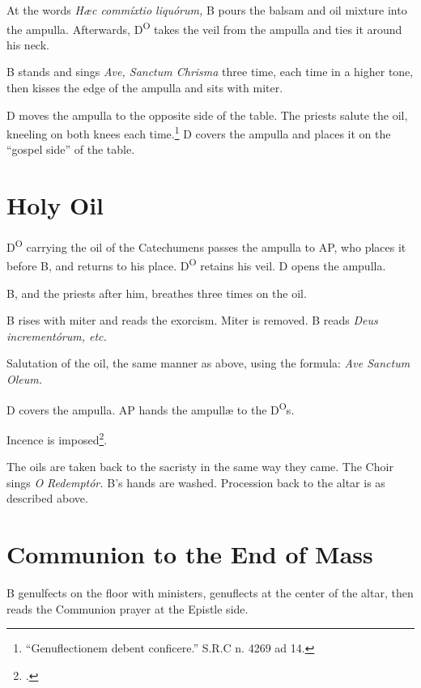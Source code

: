 \documentclass{report}
\begin{document}
\begin{multicols}{2}
    \rubric At the words \textit{Hæc commíxtio liquórum,} B pours the balsam
    and oil mixture into the ampulla. Afterwards, D\textsuperscript{O} takes
    the veil from the ampulla and ties it around his neck.

    \rubric B stands and sings \textit{Ave, Sanctum Chrisma} three time, each
    time in a higher tone, then kisses the edge of the ampulla and sits with
    miter.

    \rubric D moves the ampulla to the opposite side of the table. The priests
    salute the oil, kneeling on both knees each time.\footnote{``Genuflectionem
    debent conficere.'' S.R.C n. 4269 ad 14.} D covers the ampulla and places
    it on the ``gospel side'' of the table.

    \section{Holy Oil}

    \rubric D\textsuperscript{O} carrying the oil of the Catechumens passes the
    ampulla to AP, who places it before B, and returns to his place.
    D\textsuperscript{O} retains his veil. D opens the ampulla.

    \rubric B, and the priests after him, breathes three times on the oil.

    \rubric B rises with miter and reads the exorcism. Miter is removed. B
    reads \textit{Deus incrementórum, etc.}

    \rubric Salutation of the oil, the same manner as above, using the formula:
    \textit{Ave Sanctum Oleum.}

    \rubric D covers the ampulla. AP hands the ampullæ to the
    D\textsuperscript{O}s.

    \rubric Incence is imposed\footcite[It appears that B does not need to
    impose this incense, but it can be done by MC1 or MC2 or by TH himself.][p.
    190]{stehle}.

    \rubric The oils are taken back to the sacristy in the same way they came.
    The Choir sings \textit{O Redemptór.} B's hands are washed. Procession back
    to the altar is as described above.

    \section{Communion to the End of Mass}

    \rubric B genulfects on the floor with ministers, genuflects at the center
    of the altar, then reads the Communion prayer at the Epistle side.


\end{multicols}
\end{document}
